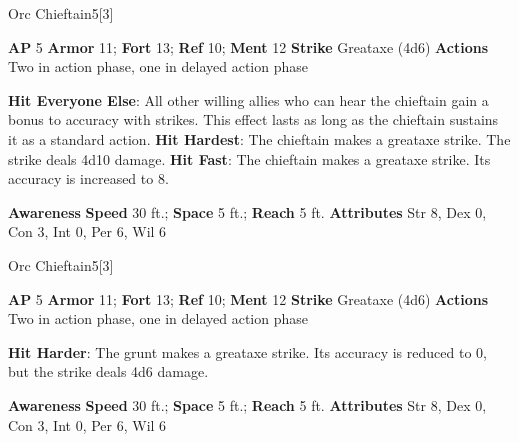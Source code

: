 \begin{monsection}{Orc Chieftain}{5}[3]
\vspace{-1em}\vspace{-1em}
\begin{spellcontent}
\begin{spelltargetinginfo}
{\textbf{AP} 5}
\pari \textbf{Armor} 11;
\textbf{Fort} 13;
\textbf{Ref} 10;
\textbf{Ment} 12
\pari \textbf{Strike} Greataxe  (4d6)
\pari \textbf{Actions} Two in action phase, one in delayed action phase
\end{spelltargetinginfo}
\begin{spelleffects}
\pari
\textbf{Hit Everyone Else}:
All other willing allies who can hear the chieftain gain a  bonus to accuracy with strikes.
This effect lasts as long as the chieftain sustains it as a standard action.
\vspace{0.5em}
\pari
\textbf{Hit Hardest}:
The chieftain makes a greataxe strike.
The strike deals 4d10 damage.
\vspace{0.5em}
\pari
\textbf{Hit Fast}:
The chieftain makes a greataxe strike.
Its accuracy is increased to 8.
\end{spelleffects}
\end{spellcontent}
\begin{spellsubcontent}
\begin{spellfooter}
\pari \textbf{Awareness} 
\pari \textbf{Speed} 30 ft.;
\textbf{Space} 5 ft.;
\textbf{Reach} 5 ft.
\pari \textbf{Attributes}
Str 8,
Dex 0,
Con 3,
Int 0,
Per 6,
Wil 6
\end{spellfooter}
\end{spellsubcontent}
\end{monsection}
\begin{monsection}{Orc Chieftain}{5}[3]
\vspace{-1em}\vspace{-1em}
\begin{spellcontent}
\begin{spelltargetinginfo}
{\textbf{AP} 5}
\pari \textbf{Armor} 11;
\textbf{Fort} 13;
\textbf{Ref} 10;
\textbf{Ment} 12
\pari \textbf{Strike} Greataxe  (4d6)
\pari \textbf{Actions} Two in action phase, one in delayed action phase
\end{spelltargetinginfo}
\begin{spelleffects}
\pari
\textbf{Hit Harder}:
The grunt makes a greataxe strike.
Its accuracy is reduced to 0, but the strike deals 4d6 damage.
\end{spelleffects}
\end{spellcontent}
\begin{spellsubcontent}
\begin{spellfooter}
\pari \textbf{Awareness} 
\pari \textbf{Speed} 30 ft.;
\textbf{Space} 5 ft.;
\textbf{Reach} 5 ft.
\pari \textbf{Attributes}
Str 8,
Dex 0,
Con 3,
Int 0,
Per 6,
Wil 6
\end{spellfooter}
\end{spellsubcontent}
\end{monsection}
